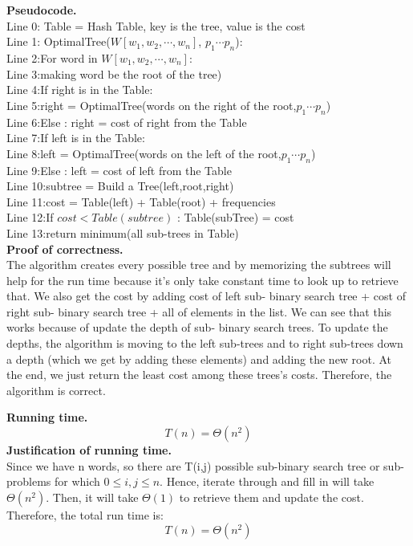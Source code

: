 \documentclass[11pt]{article}
\newcommand{\tab}{\hspace*{2em}}
\begin{document}
\noindent
\textbf{Pseudocode.}\\
Line 0: Table = Hash Table, key is the tree, value is the cost\\
Line 1: OptimalTree($W[w_1,w_2,\cdots, w_n]$, $p_1 \cdots p_n$): \\
Line 2:\tab For word in $W[w_1,w_2,\cdots, w_n]$:\\
Line 3:\tab\tab making word be the root of the tree) \\ 
Line 4:\tab\tab If right is in the Table:\\
Line 5:\tab\tab\tab right = OptimalTree(words on the right of the root,$p_1 \cdots p_n$)\\
Line 6:\tab\tab Else : right = cost of right from the Table\\
Line 7:\tab\tab If left is in the Table:\\
Line 8:\tab\tab\tab left = OptimalTree(words on the left of the root,$p_1 \cdots p_n$)\\
Line 9:\tab\tab Else : left = cost of left from the Table\\
Line 10:\tab\tab subtree = Build a Tree(left,root,right)\\
Line 11:\tab\tab cost = Table(left) + Table(root) + frequencies\\
Line 12:\tab\tab If $cost < Table(subtree)$ : Table(subTree) = cost\\
Line 13:\tab return minimum(all sub-trees in Table)\\

\noindent
\textbf{Proof of correctness.}\\
The algorithm creates every possible tree  and by memorizing the subtrees will help for the run time because it's only take constant time to look up to retrieve that. We also get the cost by adding cost of left sub- binary search tree + cost of right sub- binary search tree + all of elements in the list. We can see that this works because of update the depth of sub- binary search trees. To update the depths, the algorithm is moving to the left sub-trees and to right sub-trees down a depth (which we get by adding these elements) and adding the new root. At the end, we just return the least cost among these trees's costs. Therefore, the algorithm is correct.

\noindent
\textbf{Running time.}\\
$$\boxed{T(n) = \Theta(n^2)}$$
\noindent
\textbf{Justification of running time.}\\
Since we have n words, so there are T(i,j) possible sub-binary search tree or sub-problems for which $ 0 \leq i,j \leq n$. Hence, iterate through and fill in will take $\Theta(n^2)$. Then, it will take $\Theta(1)$ to retrieve them and update the cost. Therefore, the total run time is:
$$\boxed{T(n) = \Theta(n^2)}$$
\end{document}
